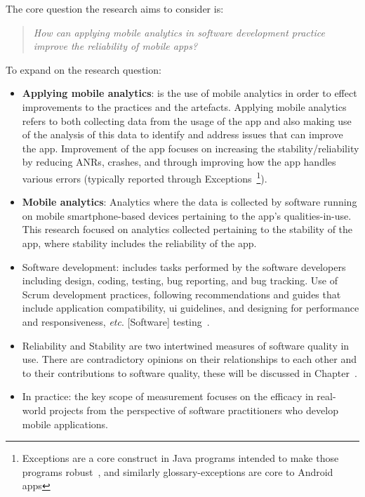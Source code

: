 The core question the research aims to consider is:

\begin{quote}
  \emph{How can applying mobile analytics in software development practice improve the reliability of mobile apps?}~\label{overall-research-question}
\end{quote}

To expand on the research question:
\begin{itemize}
    \item \textbf{Applying mobile analytics}: is the use of mobile analytics in order to effect improvements to the practices and the artefacts. Applying mobile analytics refers to both collecting data from the usage of the app and also making use of the analysis of this data to identify and address issues that can improve the app. Improvement of the app focuses on increasing the stability/reliability by reducing ANRs, crashes, and through improving how the app handles various errors (typically reported through Exceptions~\footnote{Exceptions are a core construct in Java programs intended to make those programs robust~\cite{robillard2000_designing_robust_java_programs_with_exceptions}, and similarly \glspl{glossary-exception} are core to Android apps}).
    \item \textbf{Mobile analytics}: Analytics where the data is collected by software running on mobile smartphone-based devices pertaining to the app's qualities-in-use. This research focused on analytics collected pertaining to the stability of the app, where stability includes the reliability of the app.
    \item Software development: includes tasks performed by the software developers including design, coding, testing, bug reporting, and bug tracking.  Use of Scrum development practices, following recommendations and guides that include application compatibility, \gls{ui} guidelines, and designing for performance and responsiveness, \emph{etc}. [Software] testing~.~
    \item Reliability and Stability are two intertwined measures of software quality in use. There are contradictory opinions on their relationships to each other and to their contributions to software quality, these will be discussed in Chapter~. 
    \item In practice: the key scope of measurement focuses on the efficacy in real-world projects from the perspective of software practitioners who develop mobile applications.
\end{itemize}

